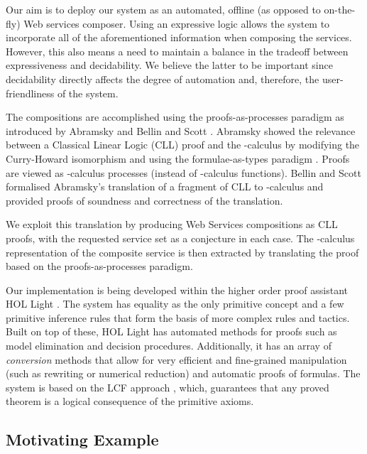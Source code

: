 \documentclass[copyright,creativecommons]{eptcs}
\begin{document}
Our aim is to deploy our system as an automated, offline (as opposed to on-the-fly) Web services composer. Using an expressive logic allows the system to incorporate all of the aforementioned information when composing the services. However, this also means a need to maintain a balance in the tradeoff between expressiveness and decidability. We believe the latter to be important since decidability directly affects the degree of automation and, therefore, the user-friendliness of the system. 

The compositions are accomplished using the proofs-as-processes paradigm as introduced by Abramsky \cite{abramsky1994proofs} and Bellin and Scott \cite{bellin1994}. Abramsky showed the relevance between a Classical Linear Logic (CLL) \cite{girard1995linear} proof and the -calculus \cite{milner1999communicating} by modifying the Curry-Howard isomorphism and using the formulae-as-types paradigm \cite{howard1980formulae}. Proofs are viewed as -calculus processes (instead of -calculus functions). Bellin and Scott formalised Abramsky's translation of a fragment of CLL to -calculus and provided proofs of soundness and correctness of the translation. 

We exploit this translation by producing Web Services compositions as CLL proofs, with the requested service set as a conjecture in each case. The -calculus representation of the composite service is then extracted by translating the proof based on the proofs-as-processes paradigm.

Our implementation is being developed within the higher order proof assistant HOL Light \cite{harrison1996hol}. The system has equality as the only primitive concept and a few primitive inference rules that form the basis of more complex rules and tactics. Built on top of these, HOL Light has automated methods for proofs such as model elimination \cite{harrison1996optimizing} and decision procedures. Additionally, it has an array of \emph{conversion} methods that allow for very efficient and fine-grained manipulation (such as rewriting or numerical reduction) and automatic proofs of formulas. The system is based on the LCF approach \cite{paulson1990logic}, which, guarantees that any proved theorem is a logical consequence of the primitive axioms.

\subsection{Motivating Example}
\end{document}
